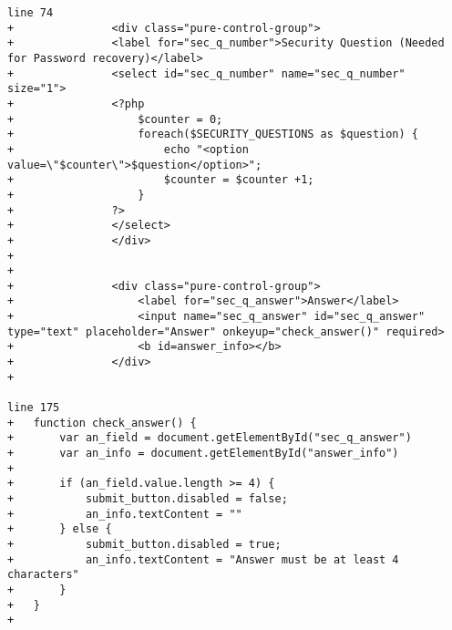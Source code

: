 \begin{lstlisting}[caption = register.php]
line 74
+		        <div class="pure-control-group">
+				<label for="sec_q_number">Security Question (Needed for Password recovery)</label>
+		        <select id="sec_q_number" name="sec_q_number" size="1">
+				<?php 
+					$counter = 0;
+					foreach($SECURITY_QUESTIONS as $question) {
+						echo "<option value=\"$counter\">$question</option>";
+						$counter = $counter +1;
+					}
+				?>
+			    </select>
+		        </div> 
+		        
+		        
+		        <div class="pure-control-group">
+		            <label for="sec_q_answer">Answer</label>
+		            <input name="sec_q_answer" id="sec_q_answer" type="text" placeholder="Answer" onkeyup="check_answer()" required>
+		            <b id=answer_info></b>
+		        </div>
+		        

line 175
+	function check_answer() {
+		var an_field = document.getElementById("sec_q_answer")
+		var an_info = document.getElementById("answer_info")
+		
+		if (an_field.value.length >= 4) {
+			submit_button.disabled = false;
+			an_info.textContent = ""
+		} else {
+			submit_button.disabled = true;
+			an_info.textContent = "Answer must be at least 4 characters"
+		}
+	}
+	
\end{lstlisting}

